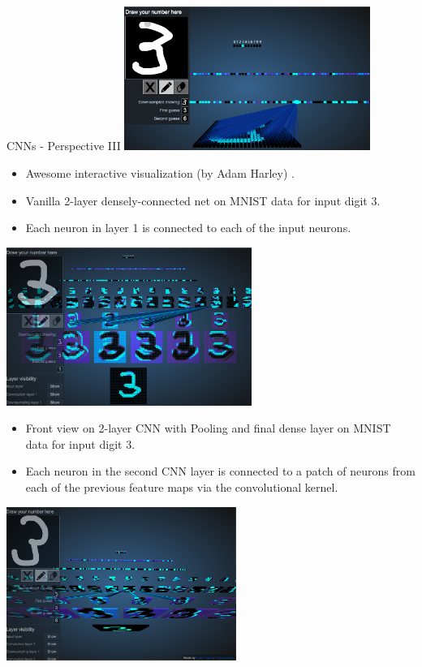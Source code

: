 \begin{vbframe}{CNNs - Perspective III}
\center
\includegraphics[width=8cm]{plots/03_first_glimpse/3dviz_fcn.png}
\begin{itemize}
\item Awesome interactive visualization (by Adam Harley)  \href{http://scs.ryerson.ca/~aharley/vis/}{}.
\item Vanilla 2-layer densely-connected net on MNIST data for input digit $3$.
\item Each neuron in layer 1 is connected to each of the input neurons.
\end{itemize}
\framebreak
\center
\includegraphics[width=8cm]{plots/03_first_glimpse/3dviz_cnn_front.png}
\begin{itemize}
\item Front view on 2-layer CNN with Pooling and final dense layer on MNIST data for input digit $3$.
\item Each neuron in the second CNN layer is connected to a patch of neurons from each of the previous feature maps via the convolutional kernel.
\end{itemize}
\framebreak
\center
\includegraphics[width=7.5cm]{plots/03_first_glimpse/3dviz_cnn_bottom.png}

\end{vbframe}
